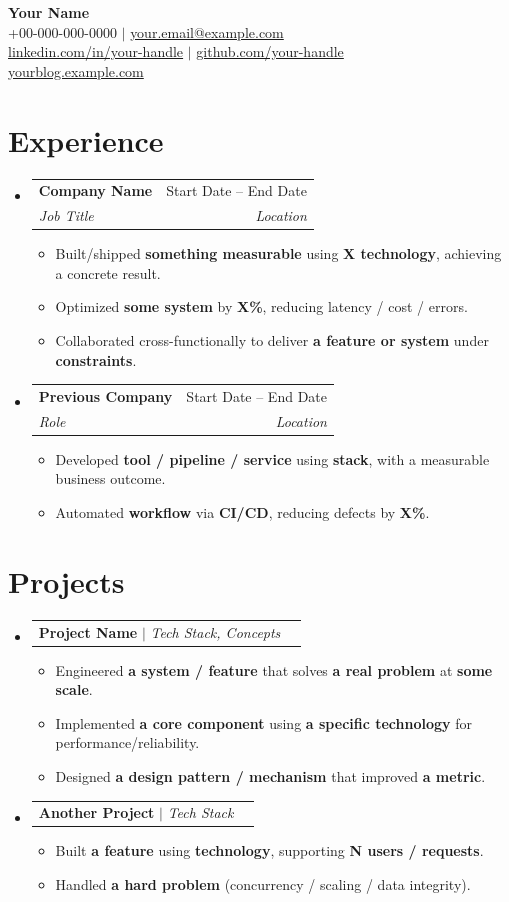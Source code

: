 \documentclass[a4paper,11pt]{article}
\makeatletter
\newcommand{\resumeItem}[1]{
  \item\small{
    {#1 \vspace{-2pt}}
  }
}
\newcommand{\resumeSubheading}[4]{
  \vspace{-2pt}\item
    \begin{tabular*}{0.97\textwidth}[t]{l@{\extracolsep{\fill}}r}
      \textbf{#1} & #2 \\
      \textit{\small#3} & \textit{\small #4} \\
    \end{tabular*}\vspace{-7pt}
}
\newcommand{\resumeProjectHeading}[2]{
    \item
    \begin{tabular*}{0.97\textwidth}{l@{\extracolsep{\fill}}r}
      \small#1 & #2 \\
    \end{tabular*}\vspace{-7pt}
}
\newcommand{\resumeSubHeadingListStart}{\begin{itemize}[leftmargin=0.15in, label={}]}
\newcommand{\resumeSubHeadingListEnd}{\end{itemize}}
\newcommand{\resumeItemListStart}{\begin{itemize}}
\newcommand{\resumeItemListEnd}{\end{itemize}\vspace{-5pt}}
\makeatother
\begin{document}
\begin{center}
    \textbf{\Huge Your Name} \\ \vspace{1pt}
    \small +00-000-000-0000 $|$ \href{mailto:your.email@example.com}{your.email@example.com} \\
    \href{https://www.linkedin.com/in/your-handle/}{linkedin.com/in/your-handle} $|$
    \href{https://github.com/your-handle}{github.com/your-handle} \\
    \href{https://yourblog.example.com}{yourblog.example.com}
\end{center}

\section{Experience}
  \resumeSubHeadingListStart

    \resumeSubheading
      {Company Name}{Start Date -- End Date}
      {Job Title}{Location}
      \resumeItemListStart
        \resumeItem{Built/shipped \textbf{something measurable} using \textbf{X technology}, achieving a concrete result.}
        \resumeItem{Optimized \textbf{some system} by \textbf{X\%}, reducing latency / cost / errors.}
        \resumeItem{Collaborated cross-functionally to deliver \textbf{a feature or system} under \textbf{constraints}.}
      \resumeItemListEnd

    \resumeSubheading
      {Previous Company}{Start Date -- End Date}
      {Role}{Location}
      \resumeItemListStart
        \resumeItem{Developed \textbf{tool / pipeline / service} using \textbf{stack}, with a measurable business outcome.}
        \resumeItem{Automated \textbf{workflow} via \textbf{CI/CD}, reducing defects by \textbf{X\%}.}
      \resumeItemListEnd

  \resumeSubHeadingListEnd


\section{Projects}
    \resumeSubHeadingListStart
      \resumeProjectHeading
          {\textbf{Project Name} $|$ \emph{Tech Stack, Concepts}}{}
          \resumeItemListStart
            \resumeItem{Engineered \textbf{a system / feature} that solves \textbf{a real problem} at \textbf{some scale}.}
            \resumeItem{Implemented \textbf{a core component} using \textbf{a specific technology} for performance/reliability.}
            \resumeItem{Designed \textbf{a design pattern / mechanism} that improved \textbf{a metric}.}
          \resumeItemListEnd
      \resumeProjectHeading
          {\textbf{Another Project} $|$ \emph{Tech Stack}}{}
          \resumeItemListStart
            \resumeItem{Built \textbf{a feature} using \textbf{technology}, supporting \textbf{N users / requests}.}
            \resumeItem{Handled \textbf{a hard problem} (concurrency / scaling / data integrity).}
          \resumeItemListEnd
    \resumeSubHeadingListEnd
\end{document}

